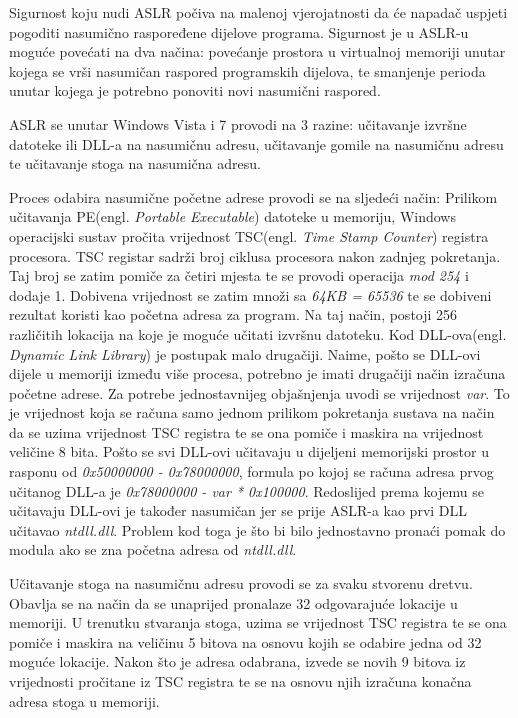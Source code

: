 \documentclass[times, utf8, diplomski, numeric]{fer}
\begin{document}
Sigurnost koju nudi ASLR počiva na malenoj vjerojatnosti da će
napadač uspjeti pogoditi nasumično raspoređene dijelove programa.
Sigurnost je u ASLR-u moguće povećati na dva načina: povećanje
prostora u virtualnoj memoriji unutar kojega se vrši nasumičan
raspored programskih dijelova, te smanjenje perioda unutar kojega
je potrebno ponoviti novi nasumični raspored. 

ASLR se unutar Windows Vista i 7 provodi na 3 razine: učitavanje
izvršne datoteke ili DLL-a na nasumičnu adresu, učitavanje gomile
na nasumičnu adresu te učitavanje stoga na nasumična adresu. 

Proces odabira nasumične početne adrese provodi se na sljedeći
način: Prilikom učitavanja PE(engl. \emph{Portable Executable})			%
datoteke u memoriju, Windows operacijski sustav pročita
vrijednost TSC(engl. \emph{Time Stamp Counter}) registra
procesora. TSC registar sadrži broj ciklusa procesora nakon
zadnjeg pokretanja. Taj broj se zatim pomiče za četiri mjesta te
se provodi operacija \emph{mod 254} i dodaje 1. Dobivena
vrijednost se zatim množi sa \emph{64KB = 65536} te se dobiveni
rezultat koristi kao početna adresa za program. Na taj način,
postoji 256 različitih lokacija na koje je moguće učitati izvršnu
datoteku. Kod DLL-ova(engl. \emph{Dynamic Link Library}) je
postupak malo drugačiji. Naime, pošto se DLL-ovi dijele u
memoriji između više procesa, potrebno je imati drugačiji način
izračuna početne adrese. Za potrebe jednostavnijeg objašnjenja
uvodi se vrijednost \emph{var}. To je vrijednost koja se računa
samo jednom prilikom pokretanja sustava na način da se uzima
vrijednost TSC registra te se ona pomiče i maskira na vrijednost
veličine 8 bita. Pošto se svi DLL-ovi učitavaju u dijeljeni
memorijski prostor u rasponu od \emph{0x50000000 - 0x78000000},
formula po kojoj se računa adresa prvog učitanog DLL-a je
\emph{0x78000000 - var * 0x100000}. Redoslijed prema kojemu se
učitavaju DLL-ovi je također nasumičan jer se prije ASLR-a kao
prvi DLL učitavao \emph{ntdll.dll}. Problem kod toga je što bi
bilo jednostavno pronaći pomak do modula ako se zna početna
adresa od \emph{ntdll.dll}. 

Učitavanje stoga na nasumičnu adresu provodi se za svaku stvorenu
dretvu. Obavlja se na način da se unaprijed pronalaze 32
odgovarajuće lokacije u memoriji. U trenutku stvaranja stoga,
uzima se vrijednost TSC registra te se ona pomiče i maskira na
veličinu 5 bitova na osnovu kojih se odabire jedna od 32 moguće
lokacije. Nakon što je adresa odabrana, izvede se novih 9 bitova
iz vrijednosti pročitane iz TSC registra te se na osnovu njih
izračuna konačna adresa stoga u memoriji.
\end{document}
